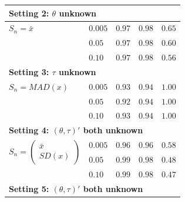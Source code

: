 \begin{table}
{\begin{tabular}{lllll}
\multicolumn{5}{l}{\textbf{Setting 2: $\theta$ unknown}}                                                                                                                                          \\ \hline
$S_n = \bar{x}$                                                          & $0.005$             & $0.97$             & $0.98$         & $0.65$               \\
                                                                         & $0.05$              & $0.97$             & $0.98$        & $0.60$                \\
                                                                         & $0.10$              & $0.97$             & $0.98$        & $0.56$                \\   \hline
\multicolumn{5}{l}{\textbf{Setting 3: $\tau$ unknown}}                                                                      \\ \hline
$S_n = MAD(x)$                                                           & $0.005$             & $0.93$             & $0.94$         & $1.00$               \\
                                                                         & $0.05$              & $0.92$             & $0.94$        & $1.00$                \\
                                                                         & $0.10$              & $0.93$             & $0.94$        & $1.00$                \\ \hline
\multicolumn{5}{l}{\textbf{Setting 4: $(\theta, \tau)'$ both unknown}}               \\ \hline
\multirow{2}{*}{$S_n = \begin{pmatrix} \bar{x} \\ SD(x)\end{pmatrix}$}   & $0.005$             & $0.96$             & $0.96$         & $0.58$               \\
                                                                         & $0.05$              & $0.99$             & $0.98$        & $0.48$                \\
                                                                         & $0.10$              & $0.99$             & $0.98$        & $0.47$                \\ \hline
\multicolumn{5}{l}{\textbf{Setting 5: $(\theta, \tau)'$ both unknown}}          \\ \hline

\end{tabular}}
\end{table}
